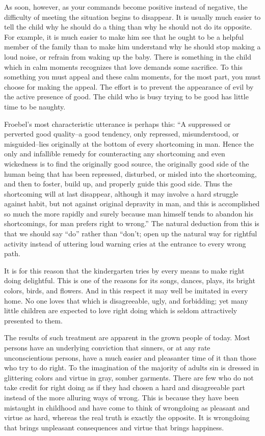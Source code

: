 \begin{linenumbers}
\indent As soon, however, as your commands become positive instead of negative, the difficulty of meeting the situation begins to disappear. It is usually much easier to tell the child why he should do a thing than why he should not do its opposite. For example, it is much easier to make him see that he ought to be a helpful member of the family than to make him understand why he should stop making a loud noise, or refrain from waking up the baby. There is something in the child which in calm moments recognizes that love demands some sacrifice. To this something you must appeal and these calm moments, for the most part, you must choose for making the appeal. The effort is to prevent the appearance of evil by the active presence of good. The child who is busy trying to be good has little time to be naughty.

\indent Froebel's most characteristic utterance is perhaps this: ``A suppressed or perverted good quality--a good tendency, only repressed, misunderstood, or misguided--lies originally at the bottom of every shortcoming in man. Hence the only and infallible remedy for counteracting any shortcoming and even wickedness is to find the originally good source, the originally good side of the human being that has been repressed, disturbed, or misled into the shortcoming, and then to foster, build up, and properly guide this good side. Thus the shortcoming will at last disappear, although it may involve a hard struggle against habit, but not against original depravity in man, and this is accomplished so much the more rapidly and surely because man himself tends to abandon his shortcomings, for man prefers right to wrong.'' The natural deduction from this is that we should say ``do'' rather than ``don't; open up the natural way for rightful activity instead of uttering loud warning cries at the entrance to every wrong path.

\indent It is for this reason that the kindergarten tries by every means to make right doing delightful. This is one of the reasons for its songs, dances, plays, its bright colors, birds, and flowers. And in this respect it may well be imitated in every home. No one loves that which is disagreeable, ugly, and forbidding; yet many little children are expected to love right doing which is seldom attractively presented to them.

\indent The results of such treatment are apparent in the grown people of today. Most persons have an underlying conviction that sinners, or at any rate unconscientious persons, have a much easier and pleasanter time of it than those who try to do right. To the imagination of the majority of adults sin is dressed in glittering colors and virtue in gray, somber garments. There are few who do not take credit for right doing as if they had chosen a hard and disagreeable part instead of the more alluring ways of wrong. This is because they have been mistaught in childhood and have come to think of wrongdoing as pleasant and virtue as hard, whereas the real truth is exactly the opposite. It is wrongdoing that brings unpleasant consequences and virtue that brings happiness.


\end{linenumbers}
